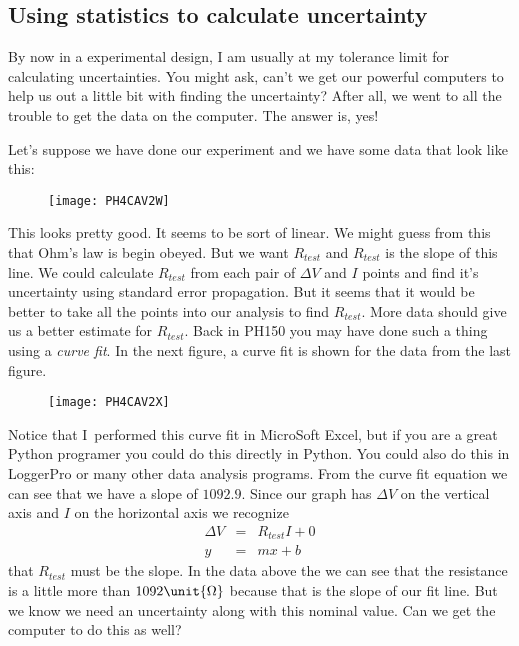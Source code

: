 \subsection{Using statistics to calculate uncertainty}

By now in a experimental design, I am usually at my tolerance limit for
calculating uncertainties. You might ask, can't we get our powerful
computers to help us out a little bit with finding the uncertainty? After
all, we went to all the trouble to get the data on the computer. The answer
is, yes!

Let's suppose we have done our experiment and we have some data that look
like this: 

\begin{figure}[h!]
	\centering
	\texttt{[image: PH4CAV2W]}
\end{figure}

This looks pretty good. It seems to be sort of linear. We might guess from
this that Ohm's law is begin obeyed. But we want $R_{test}$ and $R_{test}$
is the slope of this line. We could calculate $R_{test}$ from each pair of $%
\Delta V$ and $I$ points and find it's uncertainty using standard error
propagation. But it seems that it would be better to take all the points
into our analysis to find $R_{test}.$ More data should give us a better
estimate for $R_{test}.$ Back in PH150 you may have done such a thing using
a \emph{curve fit}. In the next figure, a curve fit is shown for the data
from the last figure. 

\begin{figure}[h!]
	\centering
	\texttt{[image: PH4CAV2X]}
\end{figure}

Notice that I\ performed this curve fit in MicroSoft Excel, but if you are a
great Python programer you could do this directly in Python. You could also
do this in LoggerPro or many other data analysis programs. From the curve
fit equation we can see that we have a slope of $1092.9.$ Since our graph
has $\Delta V$ on the vertical axis and $I$ on the horizontal axis we
recognize 
\begin{eqnarray*}
	\Delta V &=&R_{test}I+0 \\
	y &=&mx+b
\end{eqnarray*}%
that $R_{test}$ must be the slope. In the data above the we can see that the
resistance is a little more than $1092\unit{%
	\Omega%
}$ because that is the slope of our fit line. But we know we need an
uncertainty along with this nominal value. Can we get the computer to do
this as well?

